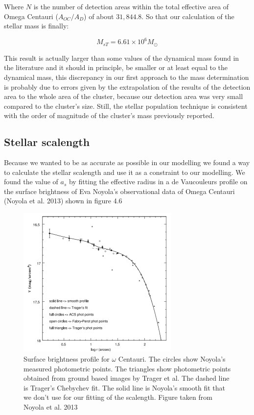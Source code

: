 Where $N$ is the number of detection areas within the total effective area of Omega Centauri ($A_{OC}/A_{D}$) of about $31,844.8$. So that our calculation of the stellar mass is finally:

\begin{equation}
M_{s T} = 6.61 \times 10^{6}M_{\odot}
\end{equation}
 
This result is actually larger than some values  of the dynamical mass found in the literature and it should in principle, be smaller or at least equal to the dynamical mass, this discrepancy in our first approach to the mass determination is probably due to errors given by the extrapolation of the results of the detection area to the whole area of the cluster, because our detection area was very small compared to the cluster's size. Still, the stellar population technique is consistent with the order of magnitude of the cluster's mass previously reported. 

\subsection{Stellar scalength}

Because we wanted to be as accurate as possible in our modelling we found a way to calculate the stellar scalength and use it as a constraint to our modelling. We found the value of $a_{s}$ by fitting the effective radius in a de Vaucouleurs profile on the surface brightness of Eva Noyola's observational data of Omega Centauri (Noyola et al. 2013) shown in figure 4.6

\begin{figure}[H]
\centering
\includegraphics[width=8cm]{images/noyola.png}
\caption[Surface brightness profile of Omega Centauri]{Surface brightness profile for $\omega$ Centauri. The circles show Noyola's measured photometric points. The triangles show photometric points obtained from ground based images by Trager et al. The dashed line is Trager’s Chebychev fit. The solid line is Noyola's smooth fit that we don't use for our fitting of the scalength. Figure taken from Noyola et al. 2013}
\end{figure}

